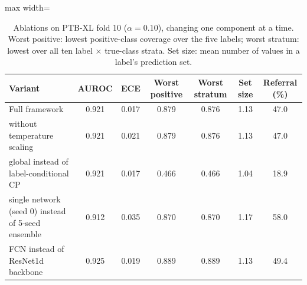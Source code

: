\begin{table}[!htbp]
\centering\small
\caption{Ablations on PTB-XL fold 10 ($\alpha=0.10$), changing one component at a time. Worst positive: lowest positive-class coverage over the five labels; worst stratum: lowest over all ten label $\times$ true-class strata. Set size: mean number of values in a label's prediction set.}
\label{tab:ablations}
\setlength{\tabcolsep}{3pt}
\begin{adjustbox}{max width=\linewidth}
\begin{tabular}{lcccccc}
\toprule
Variant & AUROC & ECE & Worst positive & Worst stratum & Set size & Referral (\%) \\
\midrule
Full framework & 0.921 & 0.017 & 0.879 & 0.876 & 1.13 & 47.0 \\
without temperature scaling & 0.921 & 0.021 & 0.879 & 0.876 & 1.13 & 47.0 \\
global instead of label-conditional CP & 0.921 & 0.017 & 0.466 & 0.466 & 1.04 & 18.9 \\
single network (seed 0) instead of 5-seed ensemble & 0.912 & 0.035 & 0.870 & 0.870 & 1.17 & 58.0 \\
FCN instead of ResNet1d backbone & 0.925 & 0.019 & 0.889 & 0.889 & 1.13 & 49.4 \\
\bottomrule
\end{tabular}
\end{adjustbox}
\end{table}
